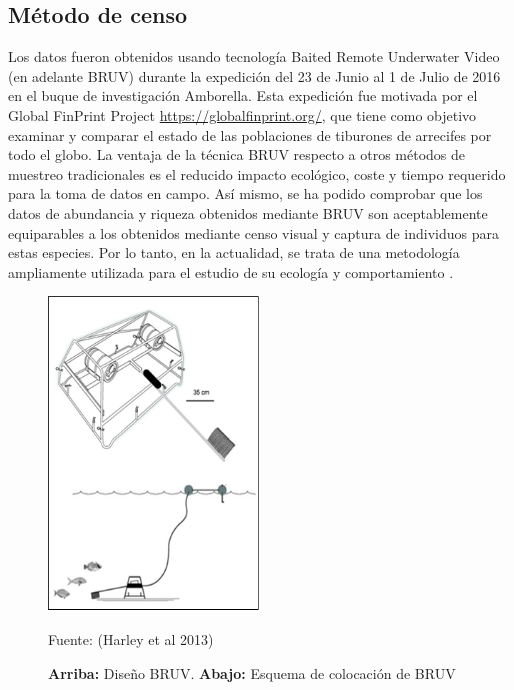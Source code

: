 \documentclass[a4paper, 11pt]{article}
\begin{document}
\subsection{Método de censo}
Los datos fueron obtenidos usando tecnología Baited Remote Underwater Video (en adelante BRUV) durante la expedición del 23 de Junio al 1 de Julio de 2016 en el buque de investigación Amborella. Esta expedición fue motivada por el Global FinPrint Project \url{https://globalfinprint.org/}, que tiene como objetivo examinar y comparar el estado de las poblaciones de tiburones de arrecifes por todo el globo. La ventaja de la técnica BRUV respecto a otros métodos de muestreo tradicionales es el reducido impacto ecológico, coste y tiempo requerido para la toma de datos en campo.  Así mismo, se ha podido comprobar que los datos de abundancia y riqueza obtenidos mediante BRUV son aceptablemente equiparables a los obtenidos mediante censo visual y captura de individuos para estas especies. Por lo tanto, en la actualidad, se trata de una metodología ampliamente utilizada para el estudio de su ecología y comportamiento \cite{Juhel2018, Speed2018}.
\begin{figure}
    \centering
    \includegraphics[width=0.5\textwidth]{BRUV.png}
    \caption{\textbf{Arriba: }Diseño BRUV. \textbf{Abajo: }Esquema de colocación de BRUV}{{\footnotesize Fuente: (Harley et al 2013)}}
    \label{fig:2}
\end{figure}
\end{document}
